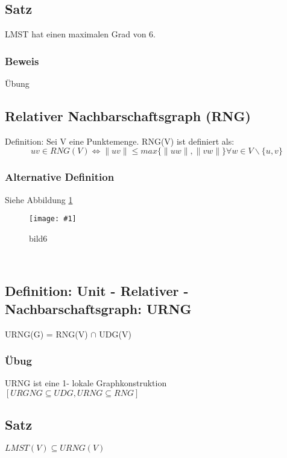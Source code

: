 \documentclass{article}
\newcommand{\bild}[4]{ %
	\begin{figure}[h!]
		\centering
		\texttt{[image: \#1]}
		\caption{#3}
		\label{#4}
	\end{figure}	
}
\newcommand{\sieheBild}[4]{
	Siehe Abbildung \ref{#4}
	\bild{#1}{#2}{#3}{#4}
}
\newcommand{\doubleAbs}[1]{
	\|#1\|
}
\begin{document}
\subsection*{Satz}
LMST hat einen maximalen Grad von 6.

\subsubsection*{Beweis}
Übung

\subsection*{Relativer Nachbarschaftsgraph (RNG)}
Definition: Sei V eine Punktemenge. RNG(V) ist definiert als:
\[
	uv \in RNG(V) \Leftrightarrow \doubleAbs{uv} \leq max\{\doubleAbs{uw}, \doubleAbs{vw}\} \forall w \in V \backslash \{u,v\}
\]

\subsubsection*{Alternative Definition}
\sieheBild{Bilder/6.png}{0.7}{bild6}{Bild 6}\\

\subsection*{Definition: Unit - Relativer - Nachbarschaftsgraph: URNG}
URNG(G) = RNG(V) $ \cap $ UDG(V)

\subsubsection*{Übug}
URNG ist eine 1- lokale Graphkonstruktion\\
$[ URGNG \subseteq UDG, URNG \subseteq RNG]$

\subsection*{Satz}
$LMST(V) \subseteq URNG(V)$
\end{document}
